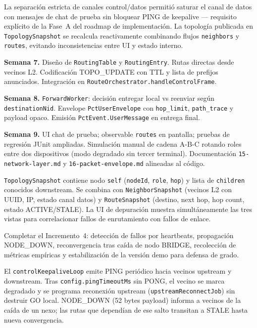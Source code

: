 La separación estricta de canales control/datos permitió saturar el canal de datos con mensajes de chat de prueba sin bloquear PING de keepalive — requisito explícito de la Fase~A del roadmap de implementación. La topología publicada en \texttt{TopologySnapshot} se recalcula reactivamente combinando flujos \texttt{neighbors} y \texttt{routes}, evitando inconsistencias entre UI y estado interno.


\textbf{Semana 7.} Diseño de \texttt{RoutingTable} y \texttt{RoutingEntry}. Rutas directas desde vecinos L2. Codificación TOPO\_UPDATE con TTL y lista de prefijos anunciados. Integración en \texttt{RouteOrchestrator.handleControlFrame}.

\textbf{Semana 8.} \texttt{ForwardWorker}: decisión entregar local vs reenviar según \texttt{destinationNid}. Envelope \texttt{PctUserEnvelope} con \texttt{hop\_limit}, \texttt{path\_trace} y payload opaco. Emisión \texttt{PctEvent.UserMessage} en entrega final.

\textbf{Semana 9.} UI chat de prueba; observable \texttt{routes} en pantalla; pruebas de regresión JUnit ampliadas. Simulación manual de cadena A-B-C rotando roles entre dos dispositivos (modo degradado sin tercer terminal). Documentación \texttt{15-network-layer.md} y \texttt{16-packet-envelope.md} alineadas al código.


\texttt{TopologySnapshot} contiene nodo \texttt{self} (\texttt{nodeId}, \texttt{role}, \texttt{hop}) y lista de \texttt{children} conocidos downstream. Se combina con \texttt{NeighborSnapshot} (vecinos L2 con UUID, IP, estado canal datos) y \texttt{RouteSnapshot} (destino, next hop, hop count, estado ACTIVE/STALE). La UI de depuración muestra simultáneamente las tres vistas para correlacionar fallos de enrutamiento con fallos de enlace.



Completar el Incremento~4: detección de fallos por heartbeats, propagación NODE\_DOWN, reconvergencia tras caída de nodo BRIDGE, recolección de métricas empíricas y estabilización de la versión demo para defensa de grado.


El \texttt{controlKeepaliveLoop} emite PING periódico hacia vecinos upstream y downstream. Tras \texttt{config.pingTimeoutMs} sin PONG, el vecino se marca degradado y se programa reconexión upstream (\texttt{upstreamReconnectJob}) sin destruir GO local. NODE\_DOWN (52 bytes payload) informa a vecinos de la caída de un nexo; las rutas que dependían de ese salto transitan a STALE hasta nueva convergencia.


